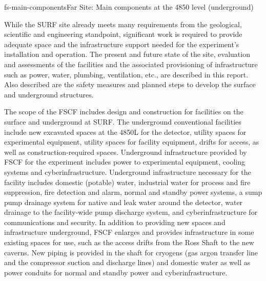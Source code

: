 \begin{cdrfigure}{fs-main-components}{Far Site: Main components at the 4850 level (underground)}
\end{cdrfigure}

While the SURF site already meets many requirements from the geological, scientific and engineering standpoint, significant work is required to provide adequate space and the infrastructure support needed for the experiment's installation and operation. The present and future state of the site, evaluation and assessments of the facilities and the associated provisioning of infrastructure such as power, water, plumbing, ventilation, etc., are described in this report. Also described are the safety measures and planned steps to develop the surface and underground structures.  

The scope of the FSCF includes design and construction for facilities on the surface and underground at 
SURF. The underground conventional facilities include new excavated spaces at the 4850L for the detector, 
utility spaces for experimental equipment, utility spaces for facility equipment, drifts for access, as well as 
construction-required spaces. Underground infrastructure provided by FSCF for the experiment includes 
power to experimental equipment, cooling systems and cyberinfrastructure. Underground infrastructure 
necessary for the facility includes domestic (potable) water, industrial water for process and fire 
suppression, fire detection and alarm, normal and standby power systems, a sump pump drainage system 
for native and leak water around the detector, water drainage to the facility-wide pump discharge system, 
and cyberinfrastructure for communications and security.  In addition to providing new spaces and 
infrastructure underground, FSCF enlarges and provides infrastructure in some existing spaces for use, 
such as the access drifts from the Ross Shaft to the new caverns. New piping is provided in the shaft for 
cryogens (gas argon transfer line and the compressor suction and discharge lines) and domestic water as 
well as power conduits for normal and standby power and cyberinfrastructure. 

